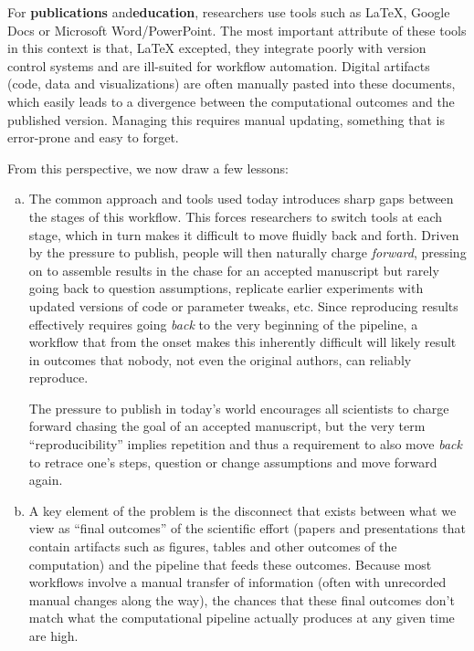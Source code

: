 \documentclass[ChapterTOCs,krantz2]{krantz} %
\begin{document}
For \textbf{publications} and\textbf{education}, researchers use tools such as
\LaTeX, Google Docs or Microsoft Word/PowerPoint.  The most important attribute
of these tools in this context is that, \LaTeX{} excepted, they integrate
poorly with version control systems and are ill-suited for workflow automation.
Digital artifacts (code, data and visualizations) are often manually pasted
into these documents, which easily leads to a divergence between the
computational outcomes and the published version.  Managing this requires
manual updating, something that is error-prone and easy to forget.

From this perspective, we now draw a few lessons:

\begin{enumerate}[(a)]

\item The common approach and tools used today introduces sharp gaps between
  the stages of this workflow.  This forces researchers to switch tools at each
  stage, which in turn makes it difficult to move fluidly back and forth.
  Driven by the pressure to publish, people will then naturally charge
  \emph{forward}, pressing on to assemble results in the chase for an accepted
  manuscript but rarely going back to question assumptions, replicate earlier
  experiments with updated versions of code or parameter tweaks, etc.  Since
  reproducing results effectively requires going \emph{back} to the very
  beginning of the pipeline, a workflow that from the onset makes this
  inherently difficult will likely result in outcomes that nobody, not even the
  original authors, can reliably reproduce.

  The pressure to publish in today's world encourages all scientists to charge
  forward chasing the goal of an accepted manuscript, but the very term
  ``reproducibility'' implies repetition and thus a requirement to also move
  \emph{back} to retrace one's steps, question or change assumptions and move
  forward again.

\item A key element of the problem is the disconnect that exists between what
  we view as ``final outcomes'' of the scientific effort (papers and
  presentations that contain artifacts such as figures, tables and other
  outcomes of the computation) and the pipeline that feeds these outcomes.
  Because most workflows involve a manual transfer of information (often with
  unrecorded manual changes along the way), the chances that these final
  outcomes don't match what the computational pipeline actually produces at any
  given time are high.


\end{enumerate}
\end{document}
